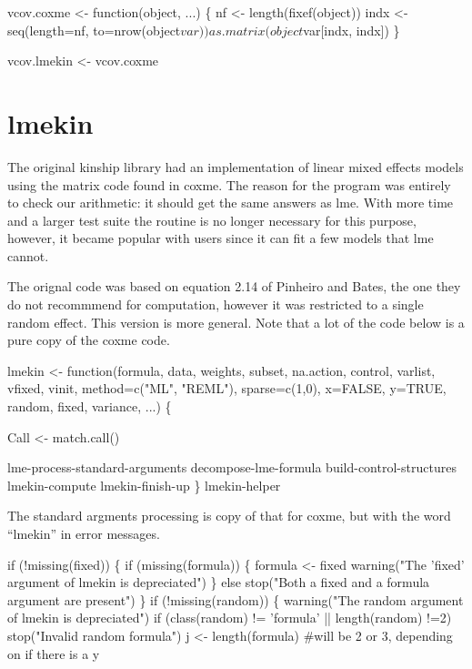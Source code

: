 \documentclass{article}
\begin{document}
vcov.coxme <- function(object, ...) \{
    nf <- length(fixef(object))
    indx <- seq(length=nf, to=nrow(object$var))
    as.matrix(object$var[indx, indx])
\}

vcov.lmekin <- vcov.coxme    
\nwendcode{}\nwdocspar
\section{lmekin}
The original kinship library had an implementation of linear mixed effects
models using the matrix code found in coxme.  
The reason for the program was entirely to check our arithmetic: it should
get the same answers as lme.
With more time and a larger test suite the routine is no longer 
necessary for this purpose, however, it became popular with 
users since it can fit a few models that lme cannot.

The orignal code was based on equation 2.14 of Pinheiro and Bates, the one
they do not recommmend for computation, however it was restricted to
a single random effect.  
This version is more general.
Note that a lot of the code below is a pure copy of the coxme code.

\nwenddocs{}\endmoddef
lmekin <- function(formula,  data, 
        weights, subset, na.action,
        control, varlist, vfixed, vinit, 
        method=c("ML", "REML"),
        sparse=c(1,0),
        x=FALSE, y=TRUE, 
        random, fixed, variance,  ...) \{

    Call <- match.call()

    \LA{}lme-process-standard-arguments\RA{}
    \LA{}decompose-lme-formula\RA{}
    \LA{}build-control-structures\RA{}
    \LA{}lmekin-compute\RA{}
    \LA{}lmekin-finish-up\RA{}
    \}
\LA{}lmekin-helper\RA{}
\nwendcode{}\nwdocspar

The standard argments processing is copy of that for coxme, but with
the word ``lmekin'' in error messages.

\nwenddocs{}\endmoddef
if (!missing(fixed)) \{
    if (missing(formula)) \{
        formula <- fixed
        warning("The 'fixed' argument of lmekin is depreciated")
        \}
    else stop("Both a fixed and a formula argument are present")
    \}
if (!missing(random)) \{
    warning("The random argument of lmekin is depreciated")
    if (class(random) != 'formula' || length(random) !=2) 
        stop("Invalid random formula")
    j <- length(formula)   #will be 2 or 3, depending on if there is a y
\end{document}
